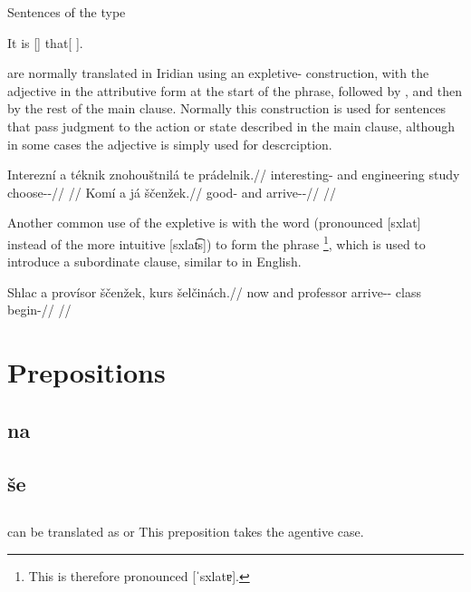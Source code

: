Sentences of the type

\ex
It is [] that[ ].
\xe

are normally translated in Iridian using an expletive- construction, with the adjective in the attributive form at the start of the phrase, followed by , and then by the rest of the main clause. Normally this construction is used for sentences that pass judgment to the action or state described in the main clause, although in some cases the adjective is simply used for descrciption.

\pex
\begingl
    \gla Interezní a téknik znohouštnilá te prádelnik.//
    \glb interesting-\Att{} and engineering study  choose-\Pv{}-\Pf{}//
    \glft {}//
\endgl
\xe
\pex
\begingl
    \gla Komí a já ščenžek.//
    \glb good-\Att{} and  arrive-\Av{}-\Pf{}//
    \glft {}//
\endgl
\xe

Another common use of the expletive  is with the word  (pronounced [sxlat] instead of the more intuitive [sxlat͡s]) to form the phrase \footnote{This is therefore pronounced [ˈsxlatɐ].}, which is used to introduce a subordinate clause, similar to  in English.

\pex
\begingl
    \gla Shlac a provísor ščenžek, kurs šelčinách.//
    \glb now and professor arrive-\Av{}-\Pf{} class begin-//
    \glft {}//
\endgl
\xe


\section{Prepositions}

\subsection{na}

\subsection{še}

\subsection{}

 can be translated as  or  This preposition takes the agentive case.

